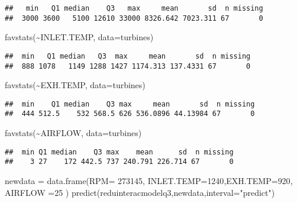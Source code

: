 \documentclass[
]{article}
\newenvironment{Shaded}{\begin{snugshade}}{\end{snugshade}}
\newcommand{\AttributeTok}[1]{\textcolor[rgb]{0.77,0.63,0.00}{#1}}
\newcommand{\DecValTok}[1]{\textcolor[rgb]{0.00,0.00,0.81}{#1}}
\newcommand{\FunctionTok}[1]{\textcolor[rgb]{0.00,0.00,0.00}{#1}}
\newcommand{\NormalTok}[1]{#1}
\newcommand{\OtherTok}[1]{\textcolor[rgb]{0.56,0.35,0.01}{#1}}
\newcommand{\SpecialCharTok}[1]{\textcolor[rgb]{0.00,0.00,0.00}{#1}}
\newcommand{\StringTok}[1]{\textcolor[rgb]{0.31,0.60,0.02}{#1}}
\begin{document}
\begin{verbatim}
##   min   Q1 median    Q3   max     mean       sd  n missing
##  3000 3600   5100 12610 33000 8326.642 7023.311 67       0
\end{verbatim}

\begin{Shaded}
\begin{Highlighting}[]
\FunctionTok{favstats}\NormalTok{(}\SpecialCharTok{\textasciitilde{}}\NormalTok{INLET.TEMP, }\AttributeTok{data=}\NormalTok{turbines)}
\end{Highlighting}
\end{Shaded}

\begin{verbatim}
##  min   Q1 median   Q3  max     mean       sd  n missing
##  888 1078   1149 1288 1427 1174.313 137.4331 67       0
\end{verbatim}

\begin{Shaded}
\begin{Highlighting}[]
\FunctionTok{favstats}\NormalTok{(}\SpecialCharTok{\textasciitilde{}}\NormalTok{EXH.TEMP, }\AttributeTok{data=}\NormalTok{turbines)}
\end{Highlighting}
\end{Shaded}

\begin{verbatim}
##  min    Q1 median    Q3 max     mean       sd  n missing
##  444 512.5    532 568.5 626 536.0896 44.13984 67       0
\end{verbatim}

\begin{Shaded}
\begin{Highlighting}[]
\FunctionTok{favstats}\NormalTok{(}\SpecialCharTok{\textasciitilde{}}\NormalTok{AIRFLOW, }\AttributeTok{data=}\NormalTok{turbines)}
\end{Highlighting}
\end{Shaded}

\begin{verbatim}
##  min Q1 median    Q3 max    mean      sd  n missing
##    3 27    172 442.5 737 240.791 226.714 67       0
\end{verbatim}

\begin{Shaded}
\begin{Highlighting}[]
\NormalTok{newdata }\OtherTok{=} \FunctionTok{data.frame}\NormalTok{(}\AttributeTok{RPM=} \DecValTok{273145}\NormalTok{, }\AttributeTok{INLET.TEMP=}\DecValTok{1240}\NormalTok{,}\AttributeTok{EXH.TEMP=}\DecValTok{920}\NormalTok{, }\AttributeTok{AIRFLOW =}\DecValTok{25}\NormalTok{  )}
\FunctionTok{predict}\NormalTok{(reduinteracmodelq3,newdata,}\AttributeTok{interval=}\StringTok{"predict"}\NormalTok{)}
\end{Highlighting}
\end{Shaded}
\end{document}
